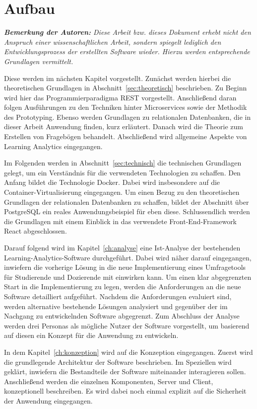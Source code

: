\section{Aufbau}

\textit{\textbf{Bemerkung der Autoren:}
Diese Arbeit bzw. dieses Dokument erhebt nicht den Anspruch einer wissenschaftlichen Arbeit, sondern spiegelt lediglich den Entwicklungsprozess der erstellten Software wieder. 
Hierzu werden entsprechende Grundlagen vermittelt.}

Diese werden im nächsten Kapitel vorgestellt.
Zunächst werden hierbei die theoretischen Grundlagen in Abschnitt~\vref{sec:theoretisch} beschrieben.
Zu Beginn wird hier das Programmierparadigma \acs{REST} vorgestellt.
Anschließend daran folgen Ausführungen zu den Techniken hinter Microservices sowie der Methodik des Prototyping.
Ebenso werden Grundlagen zu relationalen Datenbanken, die in dieser Arbeit Anwendung finden, kurz erläutert.
Danach wird die Theorie zum Erstellen von Fragebögen behandelt.
Abschließend wird allgemeine Aspekte von Learning Analytics eingegangen. 

Im Folgenden werden in Abschnitt~\vref{sec:technisch} die technischen Grundlagen gelegt, um ein Verständnis für die verwendeten Technologien zu schaffen. 
Den Anfang bildet die Technologie Docker.
Dabei wird insbesondere auf die Container-Virtualisierung eingegangen.
Um einen Bezug zu den theoretischen Grundlagen der relationalen Datenbanken zu schaffen, bildet der Abschnitt über PostgreSQL ein reales Anwendungsbeispiel für eben diese.
Schlussendlich werden die Grundlagen mit einem Einblick in das verwendete Front-End-Framework React abgeschlossen. 

Darauf folgend wird im Kapitel~\vref{ch:analyse} eine Ist-Analyse der bestehenden Learning-Analytics-Software durchgeführt. 
Dabei wird näher darauf eingegangen, inwiefern die vorherige Lösung in die neue Implementierung eines Umfragetools für Studierende und Dozierende mit einwirken kann.
Um einen klar abgegrenzten Start in die Implementierung zu legen, werden die Anforderungen an die neue Software detailliert aufgeführt. 
Nachdem die Anforderungen evaluiert sind, werden alternative bestehende Lösungen analysiert und gegenüber der im Nachgang zu entwickelnden Software abgegrenzt.
Zum Abschluss der Analyse werden drei Personas als mögliche Nutzer der Software vorgestellt, um basierend auf diesen ein Konzept für die Anwendung zu entwickeln.

In dem Kapitel~\vref{ch:konzeption} wird auf die Konzeption eingegangen. 
Zuerst wird die grundlegende Architektur der Software beschrieben.
Im Speziellen wird geklärt, inwiefern die Bestandteile der Software miteinander interagieren sollen.
Anschließend werden die einzelnen Komponenten, Server und Client, konzeptionell beschreiben.
Es wird dabei noch einmal explizit auf die Sicherheit der Anwendung eingegangen.

